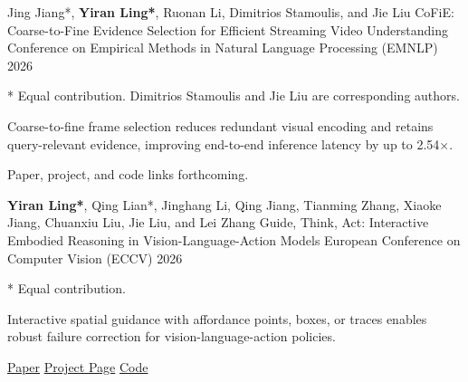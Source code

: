 
\begin{cventries}
  \cventry
    {Jing Jiang*, \textbf{Yiran Ling*}, Ruonan Li, Dimitrios Stamoulis, and Jie Liu}
    {CoFiE: Coarse-to-Fine Evidence Selection for Efficient Streaming Video Understanding}
    {Conference on Empirical Methods in Natural Language Processing (EMNLP)}
    {2026}
    {
      \begin{cvitems}
        \item {* Equal contribution. Dimitrios Stamoulis and Jie Liu are corresponding authors.}
        \item {Coarse-to-fine frame selection reduces redundant visual encoding and retains query-relevant evidence, improving end-to-end inference latency by up to 2.54$\times$.}
        \item {Paper, project, and code links forthcoming.}
      \end{cvitems}
    }

  \cventry
    {\textbf{Yiran Ling*}, Qing Lian*, Jinghang Li, Qing Jiang, Tianming Zhang, Xiaoke Jiang, Chuanxiu Liu, Jie Liu, and Lei Zhang}
    {Guide, Think, Act: Interactive Embodied Reasoning in Vision-Language-Action Models}
    {European Conference on Computer Vision (ECCV)}
    {2026}
    {
      \begin{cvitems}
        \item {* Equal contribution.}
        \item {Interactive spatial guidance with affordance points, boxes, or traces enables robust failure correction for vision-language-action policies.}
        \item {\href{https://arxiv.org/abs/2605.13632}{Paper} \enskip\textbar\enskip \href{https://signalispupupu.github.io/GTA-VLA_ProjPage/}{Project Page} \enskip\textbar\enskip \href{https://github.com/FutianLabs/GTA-VLA}{Code}}
      \end{cvitems}
    }
\end{cventries}
